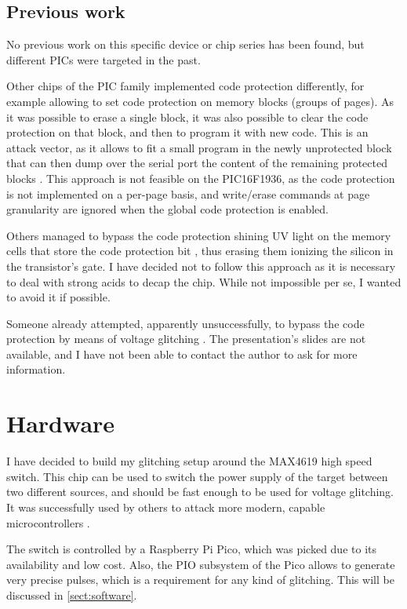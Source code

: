 \documentclass[a4paper,english,twoside,10pt]{article}
\begin{document}
\subsection{Previous work}
No previous work on this specific device or chip series has been found, but different PICs were targeted in the past.

Other chips of the PIC family implemented code protection differently, for example allowing to set code protection on memory blocks (groups of pages). As it was possible to erase a single block, it was also possible to clear the code protection on that block, and then to program it with new code. This is an attack vector, as it allows to fit a small program in the newly unprotected block that can then dump over the serial port the content of the remaining protected blocks \cite{meriac2010heart}. This approach is not feasible on the PIC16F1936, as the code protection is not implemented on a per-page basis, and write/erase commands at page granularity are ignored when the global code protection is enabled.

Others managed to bypass the code protection shining UV light on the memory cells that store the code protection bit \cite{bunniepic}, thus erasing them ionizing the silicon in the transistor's gate. I have decided not to follow this approach as it is necessary to deal with strong acids to decap the chip. While not impossible per se, I wanted to avoid it if possible.

Someone already attempted, apparently unsuccessfully, to bypass the code protection by means of voltage glitching \cite{silviocopyprotection}. The presentation's slides are not available, and I have not been able to contact the author to ask for more information.



\section{Hardware}
I have decided to build my glitching setup around the MAX4619 \cite{maxim:MAX4617-MAX4619} high speed switch. This chip can be used to switch the power supply of the target between two different sources, and should be fast enough to be used for voltage glitching. It was successfully used by others to attack more modern, capable microcontrollers \cite{gerlinskyLPC}.

The switch is controlled by a Raspberry Pi Pico, which was picked due to its availability and low cost. Also, the PIO subsystem of the Pico allows to generate very precise pulses, which is a requirement for any kind of glitching. This will be discussed in \autoref{sect:software}.
\end{document}
